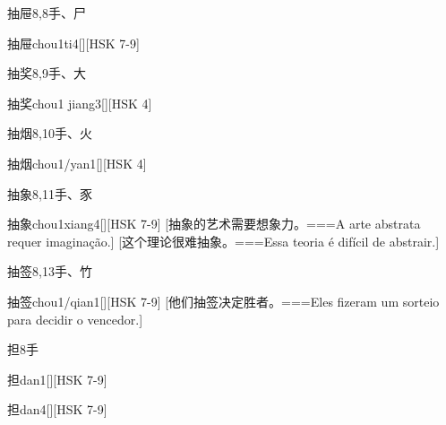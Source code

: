 \begin{Entry}{抽屉}{8,8}{⼿、⼫}
  \begin{Phonetics}{抽屉}{chou1ti4}[][HSK 7-9]
  \end{Phonetics}
\end{Entry}

\begin{Entry}{抽奖}{8,9}{⼿、⼤}
  \begin{Phonetics}{抽奖}{chou1 jiang3}[][HSK 4]
  \end{Phonetics}
\end{Entry}

\begin{Entry}{抽烟}{8,10}{⼿、⽕}
  \begin{Phonetics}{抽烟}{chou1/yan1}[][HSK 4]
  \end{Phonetics}
\end{Entry}

\begin{Entry}{抽象}{8,11}{⼿、⾗}
  \begin{Phonetics}{抽象}{chou1xiang4}[][HSK 7-9]
    [抽象的艺术需要想象力。===A arte abstrata requer imaginação.]
    [这个理论很难抽象。===Essa teoria é difícil de abstrair.]
  \end{Phonetics}
\end{Entry}

\begin{Entry}{抽签}{8,13}{⼿、⽵}
  \begin{Phonetics}{抽签}{chou1/qian1}[][HSK 7-9]
    [他们抽签决定胜者。===Eles fizeram um sorteio para decidir o vencedor.]
  \end{Phonetics}
\end{Entry}

\begin{Entry}{担}{8}{⼿}
  \begin{Phonetics}{担}{dan1}[][HSK 7-9]
  \end{Phonetics}
  \begin{Phonetics}{担}{dan4}[][HSK 7-9]
  \end{Phonetics}
\end{Entry}

